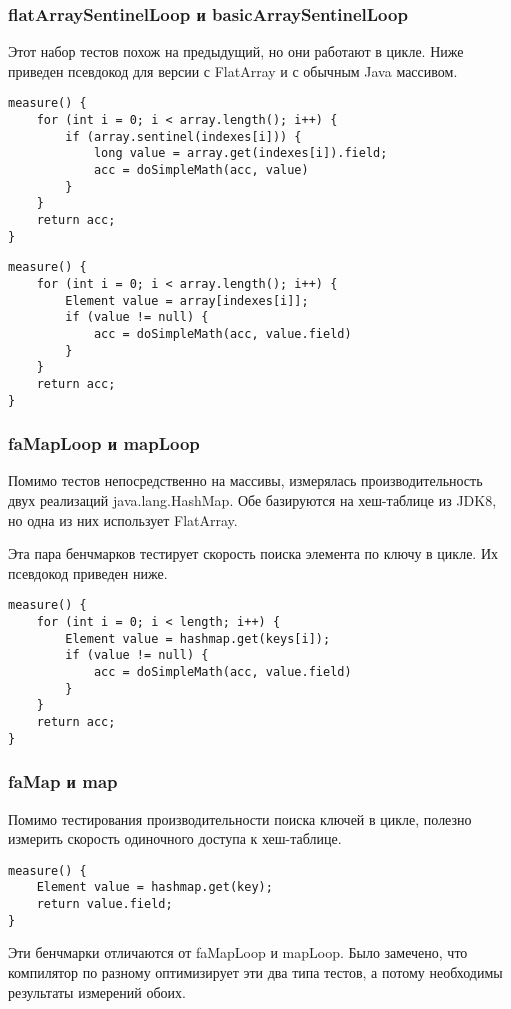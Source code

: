 \subsubsection{flatArraySentinelLoop и basicArraySentinelLoop}
Этот набор тестов похож на предыдущий, но они работают в цикле. Ниже приведен псевдокод для версии с FlatArray и с обычным Java массивом.
\begin{lstlisting}
measure() {
	for (int i = 0; i < array.length(); i++) {
		if (array.sentinel(indexes[i])) {
			long value = array.get(indexes[i]).field;
			acc = doSimpleMath(acc, value)
		}
	}
	return acc;
}
\end{lstlisting}

\begin{lstlisting}
measure() {
	for (int i = 0; i < array.length(); i++) {
		Element value = array[indexes[i]];
		if (value != null) {
			acc = doSimpleMath(acc, value.field)
		}
	}
	return acc;
}
\end{lstlisting}

\subsubsection{faMapLoop и mapLoop}
Помимо тестов непосредственно на массивы, измерялась производительность двух реализаций java.lang.HashMap. 
Обе базируются на хеш-таблице из JDK8, но одна из них использует FlatArray. 
\par
Эта пара бенчмарков тестирует скорость поиска элемента по ключу в цикле. Их псевдокод приведен ниже.
\begin{lstlisting}
measure() {
	for (int i = 0; i < length; i++) {
		Element value = hashmap.get(keys[i]);
		if (value != null) {
			acc = doSimpleMath(acc, value.field)
		}
	}
	return acc;
}
\end{lstlisting}

\subsubsection{faMap и map}
Помимо тестирования производительности поиска ключей в цикле, полезно измерить скорость одиночного доступа к хеш-таблице.
\begin{lstlisting}
measure() {
	Element value = hashmap.get(key);
	return value.field;
}
\end{lstlisting}
Эти бенчмарки отличаются от faMapLoop и mapLoop. Было замечено, что компилятор по разному оптимизирует эти два типа тестов, а потому необходимы результаты измерений обоих. 
